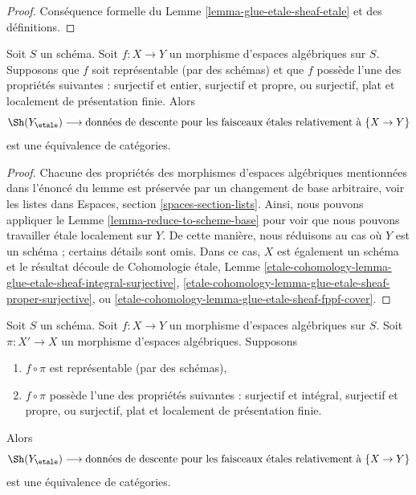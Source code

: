 \begin{proof}
Conséquence formelle du Lemme \ref{lemma-glue-etale-sheaf-etale}
et des définitions.
\end{proof}

\begin{lemma}
\label{lemma-representable-case}
Soit $S$ un schéma. Soit $f : X \to Y$ un morphisme d'espaces algébriques sur $S$. Supposons que $f$ soit représentable (par des schémas) et que $f$ possède l'une des propriétés suivantes :
surjectif et entier,
surjectif et propre, ou
surjectif, plat et localement de présentation finie.
Alors
$$
\Sh(Y_\etale)
\longrightarrow
\text{données de descente pour les faisceaux \'etales relativement à }\{X \to Y\}
$$
est une équivalence de catégories.
\end{lemma}

\begin{proof}
Chacune des propriétés des morphismes d'espaces algébriques
mentionnées dans l'énoncé du lemme est préservée par
un changement de base arbitraire, voir les listes dans
Espaces, section \ref{spaces-section-lists}.
Ainsi, nous pouvons appliquer le Lemme \ref{lemma-reduce-to-scheme-base}
pour voir que nous pouvons travailler \'etale localement sur $Y$.
De cette manière, nous réduisons au cas où $Y$ est un schéma ;
certains détails sont omis. Dans ce cas, $X$ est également un schéma
et le résultat découle de Cohomologie \'etale, Lemme
\ref{etale-cohomology-lemma-glue-etale-sheaf-integral-surjective},
\ref{etale-cohomology-lemma-glue-etale-sheaf-proper-surjective}, ou
\ref{etale-cohomology-lemma-glue-etale-sheaf-fppf-cover}.
\end{proof}

\begin{lemma}
\label{lemma-reduce-to-scheme-source}
Soit $S$ un schéma. Soit $f : X \to Y$ un morphisme d'espaces algébriques sur $S$. Soit $\pi : X' \to X$ un morphisme d'espaces algébriques. Supposons
\begin{enumerate}
\item $f \circ \pi$ est représentable (par des schémas),
\item $f \circ \pi$ possède l'une des propriétés suivantes :
surjectif et intégral,
surjectif et propre, ou
surjectif, plat et localement de présentation finie.
\end{enumerate}
Alors
$$
\Sh(Y_\etale)
\longrightarrow
\text{données de descente pour les faisceaux \'etales relativement à }\{X \to Y\}
$$
est une équivalence de catégories.
\end{lemma}

